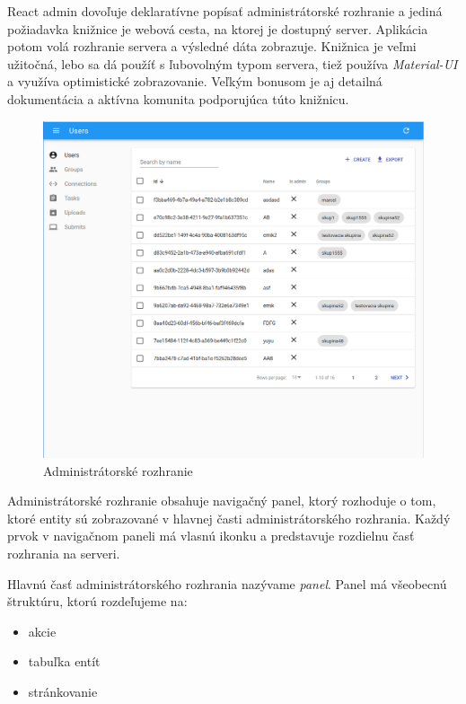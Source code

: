 React admin dovoľuje deklaratívne popísať administrátorské rozhranie a jediná požiadavka knižnice je
webová cesta, na ktorej je dostupný server. Aplikácia potom volá rozhranie servera a výsledné dáta
zobrazuje. Knižnica je veľmi užitočná, lebo sa dá použíť s ľubovolným typom servera, tiež používa
\textit{Material-UI} a využíva optimistické zobrazovanie. Veľkým bonusom je aj detailná dokumentácia
a aktívna komunita podporujúca túto knižnicu.

\begin{figure}[H]
\centerline{\includegraphics[width=1\textwidth]{images/administratorske_rozhranie}}
\caption[Administrátorské rozhranie]{Administrátorské rozhranie}
\label{obr:administratorske_rozhranie}
\end{figure}

Administrátorské rozhranie obsahuje navigačný panel, ktorý rozhoduje o tom, ktoré entity sú
zobrazované v hlavnej časti administrátorského rozhrania. Každý prvok v navigačnom paneli má vlasnú
ikonku a predstavuje rozdielnu časť rozhrania na serveri.

Hlavnú časť administrátorského rozhrania nazývame \textit{panel}. Panel má všeobecnú štruktúru,
ktorú rozdeľujeme na:
\begin{itemize}
  \item akcie
  \item tabuľka entít
  \item stránkovanie
\end{itemize}

